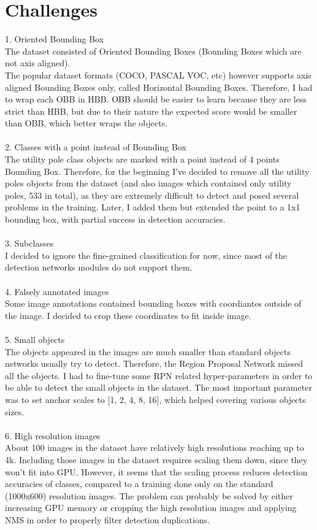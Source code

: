 \documentclass[]{article}
\begin{document}
\section{Challenges}
1. Oriented Bounding Box \\
The dataset consisted of Oriented Bounding Boxes (Bounding Boxes which are not axis aligned). \\
The popular dataset formats (COCO, PASCAL VOC, etc) however supports axis aligned Bounding Boxes only, called Horizontal Bounding Boxes. 
Therefore, I had to wrap each OBB in HBB.  
OBB should be easier to learn because they are less strict than HBB, but due to their nature the expected score would be smaller than OBB, which better wraps the objects.
\\\\
2. Classes with a point instead of Bounding Box\\
The utility pole class objects are marked with a point instead of 4 points Bounding Box. Therefore, for the beginning I've decided to remove all the utility poles objects from the dataset (and also images which contained only utility poles, 533 in total), as they are extremely difficult to detect and posed several problems in the training. Later, I added them but extended the point to a 1x1 bounding box, with partial success in detection accuracies.
\\\\
3. Subclasses\\
I decided to ignore the fine-grained classification for now, since most of the detection networks modules do not support them.
\\\\
4. Falsely annotated images\\
Some image annotations contained bounding boxes with coordiantes outside of the image. I decided to crop these coordinates to fit inside image.
\\\\
5. Small objects\\
The objects appeared in the images are much smaller than standard objects networks usually try to detect. Therefore, the Region Proposal Network missed all the objects. I had to fine-tune some RPN related hyper-parameters in order to be able to detect the small objects in the dataset. The most important parameter was to set anchor scales to [1, 2, 4, 8, 16], which helped covering various objects sizes.
\\\\
6. High resolution images\\
About 100 images in the dataset have relatively high resolutions reaching up to 4k. Including those images in the dataset requires scaling them down, since they won't fit into GPU. However, it seems that the scaling process reduces detection accuracies of classes, compared to a training done only on the standard (1000x600) resolution images. The problem can probably be solved by either increasing GPU memory or cropping the high resolution images and applying NMS in order to properly filter detection duplications.
\end{document}
